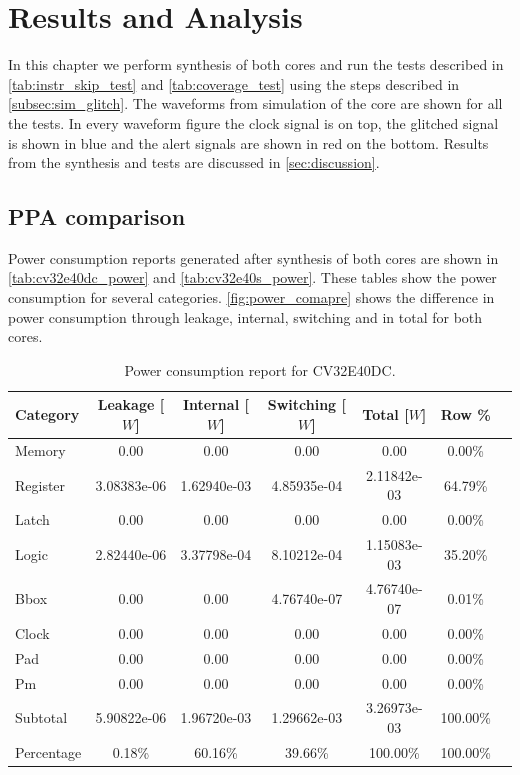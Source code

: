 \chapter{Results and Analysis}
\label{chap5}

In this chapter we perform synthesis of both cores and run the tests described in \autoref{tab:instr_skip_test} and \autoref{tab:coverage_test} using the steps described in \autoref{subsec:sim_glitch}. The waveforms from simulation of the core are shown for all the tests. In every waveform figure the clock signal is on top, the glitched signal is shown in blue and the alert signals are shown in red on the bottom. Results from the synthesis and tests are discussed in \autoref{sec:discussion}.

\section{PPA comparison}
\label{sec:synth_comparison}

Power consumption reports generated after synthesis of both cores are shown in \autoref{tab:cv32e40dc_power} and \autoref{tab:cv32e40s_power}. These tables show the power consumption for several categories. \autoref{fig:power_comapre} shows the difference in power consumption through leakage, internal, switching and in total for both cores. 

\begin{table}[h]
\centering
\caption{Power consumption report for CV32E40DC.}
\label{tab:cv32e40dc_power}
\begin{tabular}{l|cccccc}
\toprule
Category & Leakage [$W$] & Internal [$W$] & Switching [$W$] & Total [$W$] & Row \% \\
\midrule
\rowcolor{black!20} Memory & 0.00 & 0.00 & 0.00 & 0.00 & 0.00\% \\
Register & 3.08383e-06 & 1.62940e-03 & 4.85935e-04 & 2.11842e-03 & 64.79\% \\
\rowcolor{black!20}Latch & 0.00 & 0.00 & 0.00 & 0.00 & 0.00\% \\
Logic & 2.82440e-06 & 3.37798e-04 & 8.10212e-04 & 1.15083e-03 & 35.20\% \\
\rowcolor{black!20}Bbox & 0.00 & 0.00 & 4.76740e-07 & 4.76740e-07 & 0.01\% \\
Clock & 0.00 & 0.00 & 0.00 & 0.00 & 0.00\% \\
\rowcolor{black!20}Pad & 0.00 & 0.00 & 0.00 & 0.00 & 0.00\% \\
Pm & 0.00 & 0.00 & 0.00 & 0.00 & 0.00\% \\
\midrule
\rowcolor{black!20} Subtotal & 5.90822e-06 & 1.96720e-03 & 1.29662e-03 & 3.26973e-03 & 100.00\% \\
Percentage & 0.18\% & 60.16\% & 39.66\% & 100.00\% & 100.00\% \\
\bottomrule
\end{tabular}
\end{table}

